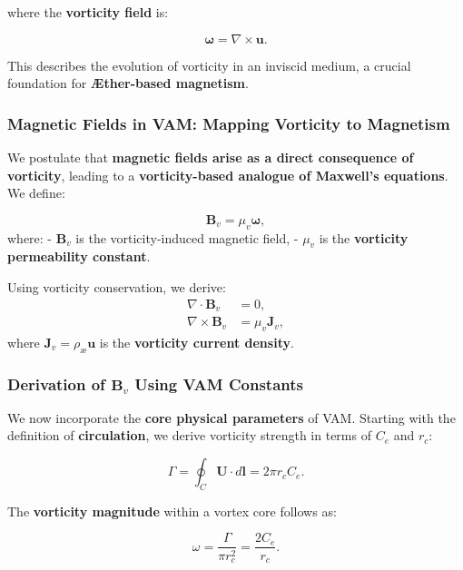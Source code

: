     where the \textbf{vorticity field} is:

    \begin{equation*}
        \boldsymbol{\omega} = \nabla \times \boldsymbol{u}.
    \end{equation*}

    This describes the evolution of vorticity in an inviscid medium, a crucial foundation for \textbf{Æther-based magnetism}.

    \subsubsection*{Magnetic Fields in VAM: Mapping Vorticity to Magnetism}
    We postulate that \textbf{magnetic fields arise as a direct consequence of vorticity}, leading to a \textbf{vorticity-based analogue of Maxwell's equations}. We define:

    \begin{equation*}
        \boldsymbol{B}_v = \mu_v \boldsymbol{\omega},
    \end{equation*}
    where:
    - \( \boldsymbol{B}_v \) is the vorticity-induced magnetic field,
    - \( \mu_v \) is the \textbf{vorticity permeability constant}.

    Using vorticity conservation, we derive:
    \begin{align}
        \nabla \cdot \boldsymbol{B}_v &= 0, \\
        \nabla \times \boldsymbol{B}_v &= \mu_v \boldsymbol{J}_v,
    \end{align}
    where \( \boldsymbol{J}_v = \rho_\text{\ae} \boldsymbol{u} \) is the \textbf{vorticity current density}.

    \subsubsection*{Derivation of \( \boldsymbol{B}_v \) Using VAM Constants}
    We now incorporate the \textbf{core physical parameters} of VAM. Starting with the definition of \textbf{circulation}, we derive vorticity strength in terms of \( C_e \) and \( r_c \):

    \begin{equation*}
        \Gamma = \oint_C \mathbf{U} \cdot d\mathbf{l} = 2\pi r_c C_e.
    \end{equation*}

    The \textbf{vorticity magnitude} within a vortex core follows as:

    \begin{equation*}
        \omega = \frac{\Gamma}{\pi r_c^2} = \frac{2 C_e}{r_c}.
    \end{equation*}

